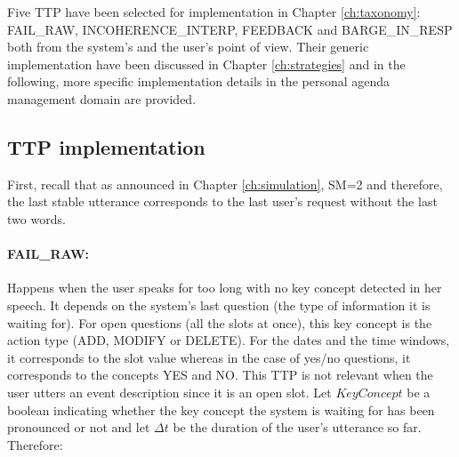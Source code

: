 		Five TTP have been selected for implementation in Chapter \ref{ch:taxonomy}:  FAIL\_RAW, INCOHERENCE\_INTERP, FEEDBACK and BARGE\_IN\_RESP both from the system's and the user's point of view. Their generic implementation have been discussed in Chapter \ref{ch:strategies} and in the following, more specific implementation details in the personal agenda management domain are provided.
    
    
	\subsection{TTP implementation}
    \label{subsec:ttpimpl}
    
    	First, recall that as announced in Chapter \ref{ch:simulation}, SM=2 and therefore, the last stable utterance corresponds to the last user's request without the last two words.
    
    	 \paragraph{FAIL\_RAW:} Happens when the user speaks for too long with no key concept detected in her speech. It depends on the system's last question (the type of information it is waiting for). For open questions (all the slots at once), this key concept is the action type (ADD, MODIFY or DELETE). For the dates and the time windows, it corresponds to the slot value whereas in the case of yes/no questions, it corresponds to the concepts YES and NO. This TTP is not relevant when the user utters an event description since it is an open slot. Let $KeyConcept$ be a boolean indicating whether the key concept the system is waiting for has been pronounced or not and let $\Delta t$ be the duration of the user's utterance so far. Therefore:
			
